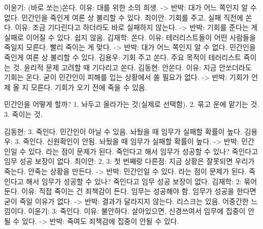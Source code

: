 \begin{solution}
  이윤기: (바로 쏘는)쏜다. 이유: 대를 위한 소의 희생.
  -> 반박: 대가 어느 쪽인지 알 수 없다. 민간인을 죽인게 여론 상 불리할 수 있다.
  최이안: 기회를 주고, 실패 직전에 쏜다. 이유: 조금 기다린다고 하더라도 바로 실패하지 않는다.
  -> 반박: 기회를 준다는 게 실패로 이어질 수 있다. 쉽지 않음.
  김재학: 쏜다. 이유: 테러리스트들이 어떤 사람들을 죽일지 모른다. 빨리 죽이는 게 맞다.
  -> 반박: 대가 어느 쪽인지 알 수 없다. 민간인을 죽인게 여론 상 불리할 수 있다.
  김용우: 기회 주고 쏜다. 주요 목적이 테러리스트 죽이는 것. 윤리적 문제 고려할 때 기다리고 쏜다.
  김동현: 안쏜다. 이유: 지금 안쏘더라도 기회는 온다. 굳이 민간인이 피해를 입는 상황에서 쏠 필요가 없다.
  -> 반박: 기회가 언제 올 지 모른다. 기회가 오기 전에 죽을 수 있음.
\end{solution}

\begin{exercise}
  민간인을 어떻게 할까? 1. 놔두고 올라가는 것(실제로 선택함). 2. 묶고 운에 맡기는 것. 3. 죽이는 것.
\end{exercise}

\begin{solution}
  김동현: 3. 죽인다. 민간인이 아닐 수 있음. 놔뒀을 때 임무가 실패할 확률이 높다.
  김용우: 3. 죽인다. 신원확인이 안됨. 놔뒀을 때 임무가 실패할 확률이 높다.
  -> 반박: 민간인일 수 있다. 라는 점이 문제가 된다. 죽인다고 해서 임무가 성공할 수 있나?
          죽인다고 임무 성공 보장이 없다.
  최이안: 2, 3: 첫 번째랑 다른점: 지금 상황은 잘못되면 우리가 죽는다. 안죽는 상황을 만든다.
  -> 반박: 민간인일 수 있다. 라는 점이 문제가 된다. 죽인다고 해서 임무가 성공할 수 있나?
          죽인다고 임무 성공 보장이 없다.
  김재학: 2: 묶어둔다. 이유: 직접 죽이는 건 죄책감이 든다. 임무는 성공해야 함. 임무가 성공을 한다면 굳이 죽일 이유가 없다.
  -> 반박: 결과가 달라지지 않는다. 리스크는 있음. 어중간한 느낌이다.
  이윤기: 3: 죽인다. 이유: 불안하다. 살아있으면, 신경쓰여서 임무에 집중이 안될 수 있다.
  -> 반박: 죽여도 죄책감에 집중이 안될 수 있다. 
\end{solution}